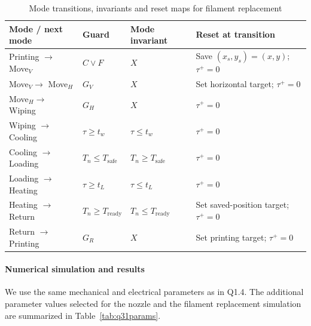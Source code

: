 \documentclass[a4paper,12pt]{article}
\begin{document}
\begin{table}[H]
\centering\small
\caption{Mode transitions, invariants and reset maps for filament replacement}
\label{tab:q31hybrid}
\begin{tabular}{>{\raggedright\arraybackslash}p{2.05cm}>{\raggedright\arraybackslash}p{3.0cm}>{\raggedright\arraybackslash}p{3.15cm}>{\raggedright\arraybackslash}p{3.1cm}}
\hline
Mode / next mode & Guard & Mode invariant & Reset at transition \\
\hline
Printing $\to$ Move$_V$ & $C\lor F$ & $X$ & Save $(x_s,y_s)=(x,y)$; $\tau^+=0$ \\
Move$_V\to$ Move$_H$ & $G_V$ & $X$ & Set horizontal target; $\tau^+=0$ \\
Move$_H\to$ Wiping & $G_H$ & $X$ & $\tau^+=0$ \\
Wiping $\to$ Cooling & $\tau\geq t_w$ & $\tau\leq t_w$ & $\tau^+=0$ \\
Cooling $\to$ Loading & $T_n\leq T_{\mathrm{safe}}$ & $T_n\geq T_{\mathrm{safe}}$ & $\tau^+=0$ \\
Loading $\to$ Heating & $\tau\geq t_L$ & $\tau\leq t_L$ & $\tau^+=0$ \\
Heating $\to$ Return & $T_n\geq T_{\mathrm{ready}}$ & $T_n\leq T_{\mathrm{ready}}$ & Set saved-position target; $\tau^+=0$ \\
Return $\to$ Printing & $G_R$ & $X$ & Set printing target; $\tau^+=0$ \\
\hline
\end{tabular}
\end{table}

\paragraph{Numerical simulation and results}
We use the same mechanical and electrical parameters as in Q1.4. The additional parameter values selected for the nozzle and the filament replacement simulation are summarized in Table~\ref{tab:q31params}.
\end{document}
